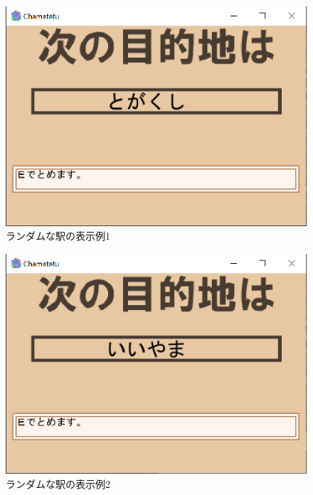 \documentclass[a4j]{jarticle}
\begin{document}
        \begin{figure}[H]
            \centering
            \includegraphics[scale=1.3]{distflg21.eps}
            \caption{ランダムな駅の表示例1}
             \label{distrand1}
            \end{figure} 

        \begin{figure}[H]
            \centering
            \includegraphics[scale=1.3]{distflg22.eps}
            \caption{ランダムな駅の表示例2}
             \label{distrand2}
            \end{figure} 
        
\end{document}
